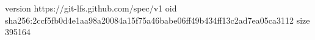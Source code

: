 version https://git-lfs.github.com/spec/v1
oid sha256:2ccf5fb0d4e1aa98a20084a15f75a46babe06ff49b434ff13c2ad7ea05ca3112
size 395164

